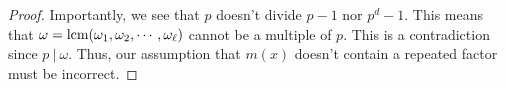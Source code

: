 \documentclass[12pt, a4paper, reqno]{amsart}
\newcommand\divides{\ | \ }
\newcommand\lcm[1]{\textup{lcm}(#1)}
\begin{document}
\begin{proof}
		Importantly, we see that $p$ doesn't divide $p-1$ nor $p^d-1$. This means that $\omega = \lcm{\omega_1, \omega_2, \cdots, \omega_\ell}$ cannot be a multiple of $p$. 
		This is a contradiction since $p \divides \omega$. Thus, our assumption that $m(x)$ doesn't contain a repeated factor must be incorrect.
		
	\end{proof}
	
	
	
\end{document}
